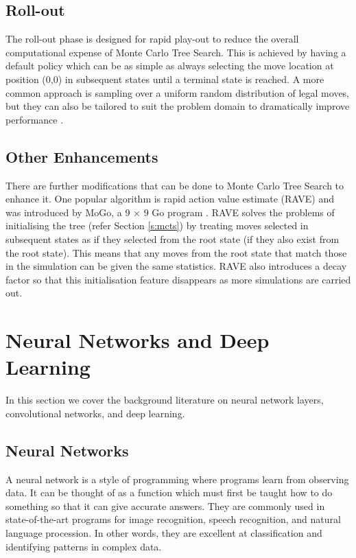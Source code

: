 \documentclass{bhamthesis}
\theoremstyle{definition}
\begin{document}
\subsection{Roll-out}\label{s:rollOut}
The roll-out phase is designed for rapid play-out to reduce the overall computational expense of Monte Carlo Tree Search. This is achieved by having a default policy which can be as simple as always selecting the move location at position (0,0) in subsequent states until a terminal state is reached. A more common approach is sampling over a uniform random distribution of legal moves, but they can also be tailored to suit the problem domain to dramatically improve performance \cite{Browne2012}.

\subsection{Other Enhancements}
There are further modifications that can be done to Monte Carlo Tree Search to enhance it. One popular algorithm is rapid action value estimate (RAVE) and was introduced by MoGo, a 9 $\times$ 9 Go program \cite{Gelly2007}. RAVE solves the problems of initialising the tree (refer Section \ref{s:mcts}) by treating moves selected in subsequent states as if they selected from the root state (if they also exist from the root state).
This means that any moves from the root state that match those in the simulation can be given the same statistics. RAVE also introduces a decay factor so that this initialisation feature disappears as more simulations are carried out.

\section{Neural Networks and Deep Learning}\label{s:NN}
In this section we cover the background literature on neural network layers, convolutional networks, and deep learning.

\subsection{Neural Networks}
A neural network is a style of programming where programs learn from observing data. It can be thought of as a function which must first be taught how to do something so that it can give accurate answers. They are commonly used in state-of-the-art programs for image recognition, speech recognition, and natural language procession. In other words, they are excellent at classification and identifying patterns in complex data.
\end{document}
